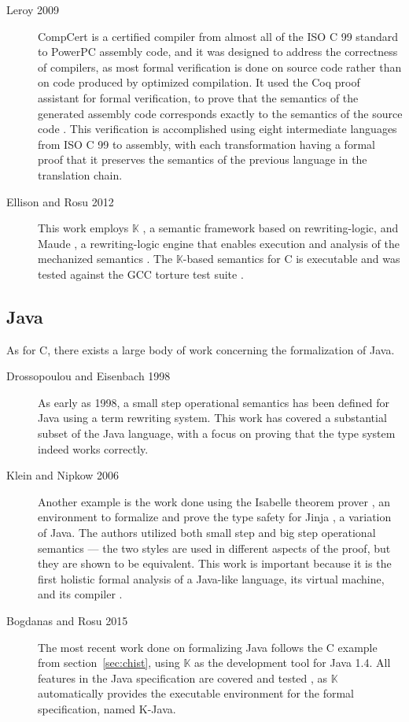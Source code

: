 \documentclass[a4paper,11pt,twoside]{report}
\begin{document}
\begin{description}
\item[Leroy 2009] CompCert is a certified compiler from almost all of the ISO C 99 standard to PowerPC assembly code, and it was designed to address the correctness of compilers, as most formal verification is done on source code rather than on code produced by optimized compilation. It used the Coq proof assistant for formal verification, to prove that the semantics of the generated assembly code corresponds exactly to the semantics of the source code \cite{Leroy-Compcert-CACM}. This verification is accomplished using eight intermediate languages from ISO C 99 to assembly, with each transformation having a formal proof that it preserves the semantics of the previous language in the translation chain.

\item[Ellison and Rosu 2012] This work employs $\mathbb{K}$ \cite{rosu-serbanuta-2010-jlap}, a semantic framework based on rewriting-logic, and Maude \cite{Clavel:2007}, a rewriting-logic engine that enables execution and analysis of the mechanized semantics \cite{Ellison:2012}. The $\mathbb{K}$-based semantics for C is executable and was tested against the GCC torture test suite \cite{Ellison:2012}. 
\end{description}

\subsection{Java}
As for C, there exists a large body of work concerning the formalization of Java.

\begin{description}
\item[Drossopoulou and Eisenbach 1998] As early as 1998, a small step operational semantics has been defined for Java \cite{drossopoulou1998towards,Drossopoulou:1999} using a term rewriting system. This work has covered a substantial subset of the Java language, with a focus on proving that the type system indeed works correctly.

\item[Klein and Nipkow 2006] Another example is the work done using the Isabelle theorem prover \cite{Paulson1989}, an environment to formalize and prove the type safety for Jinja \cite{KleinN-TOPLAS}, a variation of Java. The authors utilized both small step and big step operational semantics --- the two styles are used in different aspects of the proof, but they are shown to be equivalent. This work is important because it is the first holistic formal analysis of a Java-like language, its virtual machine, and its compiler \cite{KleinN-TOPLAS}.

\item[Bogdanas and Rosu 2015] The most recent work done on formalizing Java follows the C example from section~\ref{sec:chist}, using $\mathbb{K}$ as the development tool for Java 1.4. All features in the Java specification are covered and tested \cite{Bogdanas:2015}, as $\mathbb{K}$ automatically provides the executable environment for the formal specification, named K-Java. 
\end{description}
\end{document}

